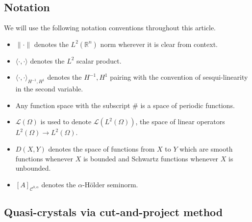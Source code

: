\documentclass[a4paper,reqno]{amsart}
\numberwithin{equation}{section}
\numberwithin{equation}{section}		%
\numberwithin{figure}{section}			%
\numberwithin{table}{section}				%
\newcommand{\ntodo}[1]{\todo[inline, backgroundcolor=blue!20!white, bordercolor=blue]{Niklas: #1}}
\theoremstyle{definition}
\newcommand{\<}{\ensuremath \leq}
\renewcommand{\>}{\ensuremath \geq}
\begin{document}
\subsection{Notation}
We will use the following notation conventions throughout this article.

\begin{itemize}
    \item $\lVert \cdot \rVert$ denotes the $L^2(\mathbb{R}^n)$ norm wherever it is clear from context.
    \item $\langle \cdot,\cdot\rangle$ denotes the $L^2$ scalar product.
    \item $\langle \cdot,\cdot\rangle_{H^{-1},H^1}$ denotes the $H^{-1},H^1$ pairing with the convention of sesqui-linearity in the second variable.
    \item Any function space with the subscript $\#$ is a space of periodic functions.
    \item ${\mathcal L}(\Omega)$ is used to denote ${\mathcal L}(L^2(\Omega))$, the space of linear operators $L^2(\Omega)\to L^2(\Omega)$.
    \item $D(X,Y)$ denotes the space of functions from $X$ to $Y$ which are smooth functions whenever $X$ is bounded and Schwartz functions whenever $X$ is unbounded.
    \item $[A]_{\mathcal{C}^{0,\alpha}}$ denotes the $\alpha$-Hölder seminorm.
\end{itemize}
\subsection{Quasi-crystals via cut-and-project method}
\end{document}
